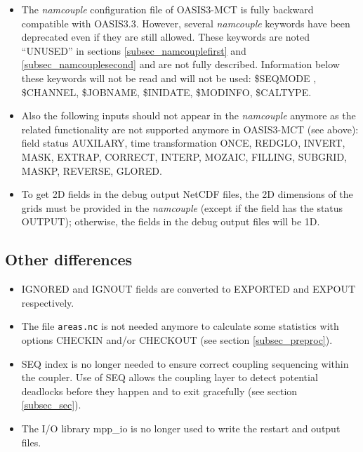 \begin{itemize}

\item The {\it namcouple} configuration file of OASIS3-MCT is fully backward
compatible with OASIS3.3. However, several {\it namcouple} keywords
have been deprecated even if they are still 
allowed.  These keywords are noted ``UNUSED'' in sections
\ref{subsec_namcouplefirst} and \ref{subsec_namcouplesecond} and are
not fully described. Information below these keywords will not be read
and will not be used: \$SEQMODE , \$CHANNEL, \$JOBNAME, \$INIDATE,
\$MODINFO, \$CALTYPE.

\item Also the following inputs should not appear in the {\it namcouple}
anymore as the related functionality are not supported anymore in
OASIS3-MCT (see above): field status AUXILARY, time transformation
ONCE, REDGLO, INVERT, MASK, EXTRAP, CORRECT, INTERP, MOZAIC, FILLING,
SUBGRID, MASKP, REVERSE, GLORED. 

\item To get 2D fields in the debug output NetCDF files, the 2D dimensions of the
  grids must be provided in the {\it namcouple} (except if the field
  has the status OUTPUT); otherwise, the fields in the debug output files will be 1D.

\end{itemize}

\subsection{Other differences}
\label{sec_changes_other}

\begin{itemize}

\item IGNORED and IGNOUT fields are converted to EXPORTED and EXPOUT
  respectively.

\item The file {\tt areas.nc} is not needed anymore to calculate some
  statistics with options CHECKIN and/or CHECKOUT (see section \ref{subsec_preproc}).

\item SEQ index is no longer needed to ensure correct coupling
  sequencing within the coupler. Use of SEQ allows the coupling layer
  to detect potential deadlocks before they happen and to exit
  gracefully (see section \ref{subsec_sec}).

\item The I/O library mpp\_io is no longer used to write the restart and output files.


\end{itemize}
